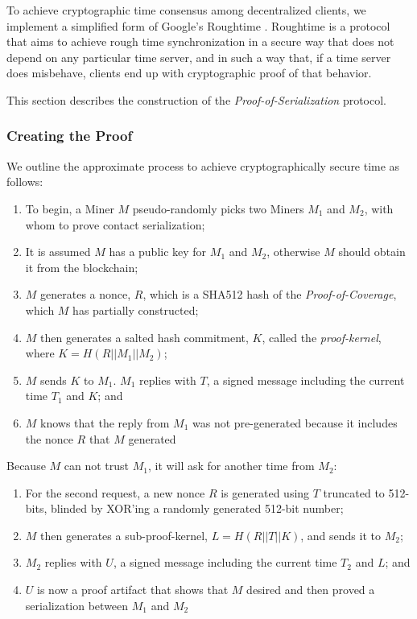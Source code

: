 \documentclass[10pt, nonatbib, nocopyrightspace, reprint]{sigplanconf}
\begin{document}
To achieve cryptographic time consensus among decentralized clients, we implement a simplified form of Google's Roughtime \cite{roughtime}. Roughtime is a protocol that aims to achieve rough time synchronization in a secure way that does not depend on any particular time server, and in such a way that, if a time server does misbehave, clients end up with cryptographic proof of that behavior.

This section describes the construction of the \emph{Proof-of-Serialization} protocol.

\subsubsection{Creating the Proof}

We outline the approximate process to achieve cryptographically secure time as follows:

\begin{enumerate}
        \item To begin, a Miner $M$ pseudo-randomly picks two Miners $M_1$ and $M_2$, with whom to prove contact serialization;
        \item It is assumed $M$ has a public key for $M_1$ and $M_2$, otherwise $M$ should obtain it from the blockchain;
        \item $M$ generates a nonce, $R$, which is a SHA512 hash of the \emph{Proof-of-Coverage}, which $M$ has partially constructed;
        \item $M$ then generates a salted hash commitment, $K$, called the \emph{proof-kernel}, where ${K = H\left(R || M_1 || M_2\right)}$;
        \item $M$ sends $K$ to $M_1$. $M_1$ replies with $T$, a signed message including the current time $T_1$ and $K$; and
        \item $M$ knows that the reply from $M_1$ was not pre-generated because it includes the nonce $R$ that $M$ generated
\end{enumerate}

Because $M$ can not trust $M_1$, it will ask for another time from $M_2$:

\begin{enumerate}
        \item For the second request, a new nonce $R$ is generated using $T$ truncated to 512-bits, blinded by XOR'ing a randomly generated 512-bit number;
        \item $M$ then generates a sub-proof-kernel, $L = H\left(R || T || K\right)$, and sends it to $M_2$;
        \item $M_2$ replies with $U$, a signed message including the current time $T_2$ and $L$; and
        \item $U$ is now a proof artifact that shows that $M$ desired and then proved a serialization between $M_1$ and $M_2$
\end{enumerate}
\end{document}

